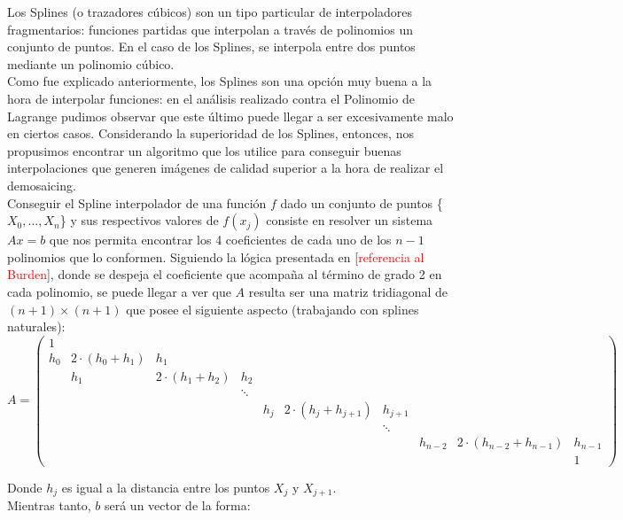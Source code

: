 \documentclass[a4paper]{article}
\begin{document}
Los Splines (o trazadores cúbicos) son un tipo particular de interpoladores fragmentarios: funciones partidas que interpolan a través de polinomios un conjunto de puntos. En el caso de los Splines, se interpola entre dos puntos mediante un polinomio cúbico.\\

Como fue explicado anteriormente, los Splines son una opción muy buena a la hora de interpolar funciones: en el análisis realizado contra el Polinomio de Lagrange pudimos observar que este último puede llegar a ser excesivamente malo en ciertos casos. Considerando la superioridad de los Splines, entonces, nos propusimos encontrar un algoritmo que los utilice para conseguir buenas interpolaciones que generen imágenes de calidad superior a la hora de realizar el demosaicing.\\

Conseguir el Spline interpolador de una función $f$ dado un conjunto de puntos \{\(X_0, ..., X_n\)\} y sus respectivos valores de $f(x_j)$ consiste en resolver un sistema \(Ax = b\) que nos permita encontrar los 4 coeficientes de cada uno de los $n-1$ polinomios que lo conformen. Siguiendo la lógica presentada en [\textcolor{red}{referencia al Burden}], donde se despeja el coeficiente que acompaña al término de grado 2 en cada polinomio, se puede llegar a ver que $A$ resulta ser una matriz tridiagonal de $(n+1)\times(n+1)$ que posee el siguiente aspecto (trabajando con splines naturales): \\

\[
A = \left(
\begin{array}{cccccccccc}
1 &  &  &  &  &  &  & &  & \\
h_0 & 2\cdot(h_0+h_1) & h_1 &   & & & & &  & \\
 & h_1 & 2\cdot(h_1+h_2) & h_2 & & & & &  & \\
 &  &  & \ddots &  &  &  &  &  &  \\
 &  &  &  & h_j & 2\cdot(h_j+h_{j+1}) & h_{j+1} & &  & \\
 &  &  &  &  &  & \ddots &  &  &  \\
 &  &  &  &  & & & h_{n-2} & 2\cdot(h_{n-2}+h_{n-1}) &h_{n-1}\\
 &  &  &  &  &  &  &  &  & 1
\end{array}
\right)
\]

\bigskip
\noindent Donde $h_j$ es igual a la distancia entre los puntos $X_j$ y $X_{j+1}$. \\
Mientras tanto, $b$ será un vector de la forma:
\end{document}
